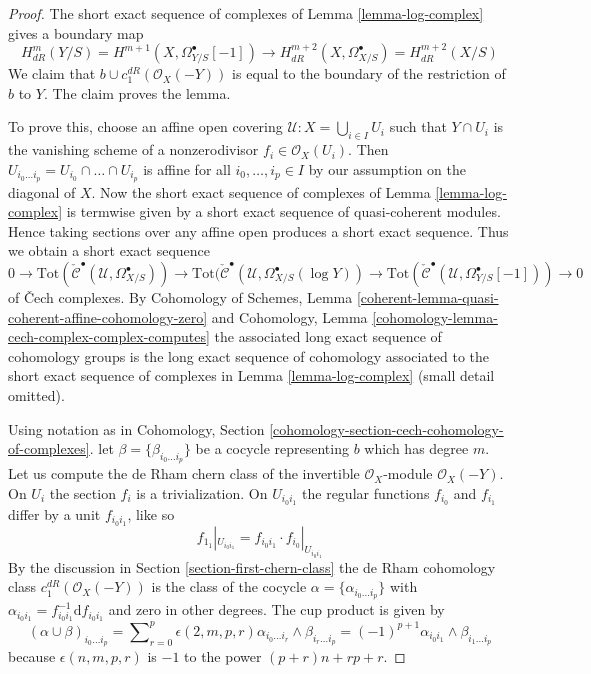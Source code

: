 \begin{proof}
The short exact sequence of complexes of Lemma \ref{lemma-log-complex}
gives a boundary map
$$
H^m_{dR}(Y/S) =
H^{m + 1}(X, \Omega^\bullet_{Y/S}[-1]) \to
H^{m + 2}_{dR}(X, \Omega^\bullet_{X/S}) = H^{m + 2}_{dR}(X/S)
$$
We claim that $b \cup c_1^{dR}(\mathcal{O}_X(-Y))$ is equal to
the boundary of the restriction of $b$ to $Y$. The claim proves the lemma.

\medskip\noindent
To prove this, choose an affine open covering
$\mathcal{U} : X = \bigcup_{i \in I} U_i$ such that
$Y \cap U_i$ is the vanishing scheme of a nonzerodivisor
$f_i \in \mathcal{O}_X(U_i)$.
Then $U_{i_0 \ldots i_p} = U_{i_0} \cap \ldots \cap U_{i_p}$
is affine for all $i_0, \ldots, i_p \in I$ by our assumption on
the diagonal of $X$. Now the short exact sequence of complexes of
Lemma \ref{lemma-log-complex}
is termwise given by a short exact sequence of quasi-coherent modules.
Hence taking sections over any affine open produces a short exact
sequence. Thus we obtain a short exact sequence
$$
0 \to
\text{Tot}(\check{\mathcal{C}}^\bullet(\mathcal{U}, \Omega_{X/S}^\bullet)) \to
\text{Tot}(\check{\mathcal{C}}^\bullet(\mathcal{U},
\Omega_{X/S}^\bullet(\log Y)) \to
\text{Tot}(\check{\mathcal{C}}^\bullet(\mathcal{U}, \Omega_{Y/S}^\bullet[-1]))
\to 0
$$
of {\v C}ech complexes. By Cohomology of Schemes, Lemma
\ref{coherent-lemma-quasi-coherent-affine-cohomology-zero} and
Cohomology, Lemma
\ref{cohomology-lemma-cech-complex-complex-computes}
the associated long exact sequence of cohomology groups is the
long exact sequence of cohomology associated to the short exact
sequence of complexes in Lemma \ref{lemma-log-complex}
(small detail omitted).

\medskip\noindent
Using notation as in
Cohomology, Section \ref{cohomology-section-cech-cohomology-of-complexes}.
let $\beta = \{\beta_{i_0 \ldots i_p}\}$ be a cocycle representing $b$
which has degree $m$.
Let us compute the de Rham chern class of the invertible $\mathcal{O}_X$-module
$\mathcal{O}_X(-Y)$. On $U_i$ the section $f_i$ is a trivialization.
On $U_{i_0i_1}$ the regular functions $f_{i_0}$ and $f_{i_1}$
differ by a unit $f_{i_0i_1}$, like so
$$
f_{1_1}|_{U_{i_0i_1}} = f_{i_0i_1} \cdot f_{i_0}|_{U_{i_0i_1}}
$$
By the discussion in Section \ref{section-first-chern-class}
the de Rham cohomology class $c_1^{dR}(\mathcal{O}_X(-Y))$
is the class of the cocycle $\alpha = \{\alpha_{i_0 \ldots i_p}\}$
with $\alpha_{i_0i_1} = f_{i_0i_1}^{-1} \text{d}f_{i_0i_1}$
and zero in other degrees. The cup product is given by
$$
(\alpha \cup \beta)_{i_0 \ldots i_p} =
\sum\nolimits_{r = 0}^p
\epsilon(2, m, p, r)
\alpha_{i_0 \ldots i_r} \wedge \beta_{i_r \ldots i_p} =
(-1)^{p + 1} \alpha_{i_0i_1} \wedge \beta_{i_1 \ldots i_p}
$$
because $\epsilon(n, m, p, r)$ is $-1$ to the power
$(p + r)n + rp + r$.


\end{proof}
